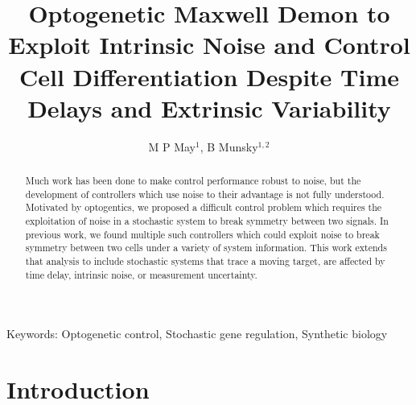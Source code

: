\documentclass[12pt]{article}
\begin{document}
\title{Optogenetic Maxwell Demon to Exploit Intrinsic Noise and Control Cell Differentiation Despite Time Delays and Extrinsic Variability}
\maketitle

\author{M P May$^1$, B Munsky$^{1,2}$}



\begin{abstract}

Much work has been done to make control performance robust to noise, but the development of controllers which use noise to their advantage is not fully understood.
Motivated by optogentics, we proposed a difficult control problem which requires the exploitation of noise in a stochastic system to break symmetry between two signals.
In previous work, we found multiple such controllers which could exploit noise to break symmetry between two cells under a variety of system information.
This work extends that analysis to include stochastic systems that trace a moving target, are affected by time delay, intrinsic noise, or measurement uncertainty.
\end{abstract}
Keywords: Optogenetic control, Stochastic gene regulation, Synthetic biology

%
%
%
\maketitle
% 

\section{Introduction}
\end{document}
